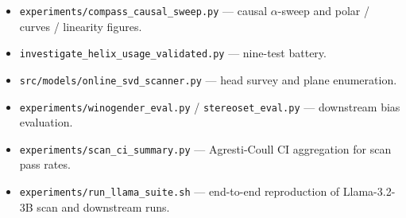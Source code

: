 \begin{itemize}
    \item \texttt{experiments/compass\_causal\_sweep.py} --- causal
    $\alpha$-sweep and polar / curves / linearity figures.
    \item \texttt{investigate\_helix\_usage\_validated.py} ---
    nine-test battery.
    \item \texttt{src/models/online\_svd\_scanner.py} --- head survey
    and plane enumeration.
    \item \texttt{experiments/winogender\_eval.py} /
    \texttt{stereoset\_eval.py} --- downstream bias evaluation.
    \item \texttt{experiments/scan\_ci\_summary.py} --- Agresti-Coull
    CI aggregation for scan pass rates.
    \item \texttt{experiments/run\_llama\_suite.sh} --- end-to-end
    reproduction of Llama-3.2-3B scan and downstream runs.
\end{itemize}
